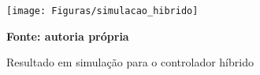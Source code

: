 \begin{figure}[ht]
\centering
\caption{Resultado em simulação para o controlador híbrido}
\label{fig:resultadoSimulacaoHibrido}
		\centering
		\texttt{[image: Figuras/simulacao\_hibrido]}
		
	\textbf{Fonte: autoria própria}
\end{figure}